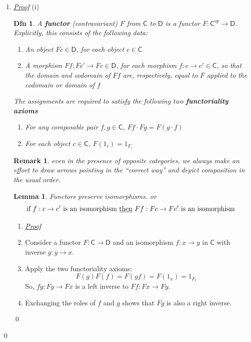 \documentclass{article}
\theoremstyle{spacious}
\newtheorem*{dfn}{Dfn}
\newtheorem*{rmk}{Remark}
\newtheorem*{lem}{Lemma}
\newenvironment{pf}{\begin{enumerate} \item[] \textit{\underline{Proof}} }{\end{enumerate}\qed}
\renewcommand{\:}{\vcentcolon=} %
\begin{document}
\begin{pf}{(i)}
\begin{dfn} A \textbf{functor} (contravariant) \(F\) from \(\mathsf{C}\) to \(\mathsf{D}\) is a functor \(F: \mathsf{C}^{op} \to \mathsf{D}\). Explicitly, this consists of the following data:
\begin{enumerate}
    \item[] An object \(Fc\in \mathsf{D}\), for each object \(c\in \mathsf{C}\)
    \item[] A morphism \(Ff:Fc'\to Fc \in \mathsf{D}\), for each morphism \(f:c\to c' \in \mathsf{C}\), so that the domain and codomain of \(Ff\) are, respectively, equal to \(F\) applied to the codomain or domain of \(f\)
\end{enumerate}
The assignments are required to satisfy the following two \textbf{functoriality axioms}
\begin{enumerate}
    \item[] For any composable pair \(f,g \in \mathsf{C}\), \(Ff\cdot Fg=F \left(g\cdot f\right)\)
    \item[] For each object \(c\in \mathsf{C}\), \(F \left(1_c\right)=1_{F_c}\)
\end{enumerate}
\end{dfn}

\begin{rmk}
    even in the presence of opposite categories, we always make an effort to draw arrows pointing in the “correct way” and depict composition in the usual order.
\end{rmk}

\begin{lem} Functors preserve isomorphisms.  or
    \[
        \text{if } f:c \to c' \text{ is an isomorphism \underline{then} }  Ff:Fc \to Fc' \text{ is an isomorphism}
    \]
\end{lem}

\begin{pf}
    \item[] Consider a functor \(F:\mathsf{C}\to \mathsf{D}\) and an isomorphism \(f:x \to y\) in \(\mathsf{C}\) with inverse \(g:y\to x\).
    \item[] Apply the two functoriality axioms:
    \[
        F(g)F(f)=F(gf)=F(1_x)=1_{F_x}
    \]
    So, \(fg:Fy \to Fx\) is a left inverse to \(Ff:Fx \to Fy\).  
    \item[] Exchanging the roles of \(f\) and \(g\) shows that \(Fg\) is also a right inverse.
\end{pf}


\end{pf}
\end{document}
